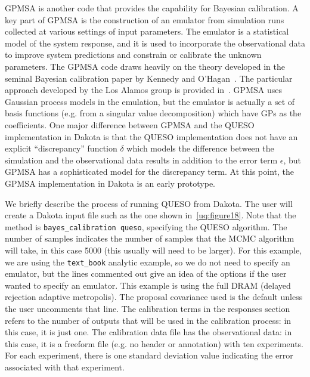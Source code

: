 GPMSA is another code that provides the capability for Bayesian 
calibration.
A key part of GPMSA is the construction of an emulator from simulation runs 
collected at various settings of input parameters. The emulator is a 
statistical model of the system response, and it is used to incorporate 
the observational data to improve system predictions and constrain or 
calibrate the unknown parameters. The GPMSA code draws heavily 
on the theory developed in the seminal Bayesian calibration paper 
by Kennedy and O'Hagan~\cite{Kenn01}. The particular approach developed 
by the Los Alamos group is provided in~\cite{Hig08}. GPMSA uses 
Gaussian process models in the emulation, but the emulator is 
actually a set of basis functions (e.g. from a singular value 
decomposition) which have GPs as the coefficients. One major 
difference between GPMSA and the QUESO implementation in Dakota 
is that the QUESO implementation does not have an explicit 
``discrepancy'' function $\delta$ which models the difference between 
the simulation and the observational data results in addition 
to the error term $\epsilon$, but GPMSA has a sophisticated 
model for the discrepancy term. 
At this point, the GPMSA implementation in Dakota is an early 
prototype. 
 

We briefly describe the process of running QUESO from Dakota.
The user will create a Dakota input file such as the one shown 
in~\ref{uq:figure18}. 
Note that the method is \texttt{bayes\_calibration queso}, 
specifying the QUESO algorithm. The number of 
samples indicates the number of samples that the MCMC algorithm 
will take, in this case 5000 (this usually will need to be larger). 
For this example, we are using the \texttt{text\_book} analytic 
example, so we do not need to specify an emulator, but the lines 
commented out give an idea of the options if the user wanted to 
specify an emulator. This example is using the full DRAM (delayed
rejection adaptive metropolis). The proposal covariance 
used is the default unless the user uncomments that line. 
The calibration terms in the responses section refers to the 
number of outputs that will be used in the calibration process:  
in this case, it is just one. The calibration data file 
has the observational data:  in this case, it is a freeform file 
(e.g. no header or annotation) with ten experiments. For each 
experiment, there is one standard deviation value indicating the 
error associated with that experiment. 

